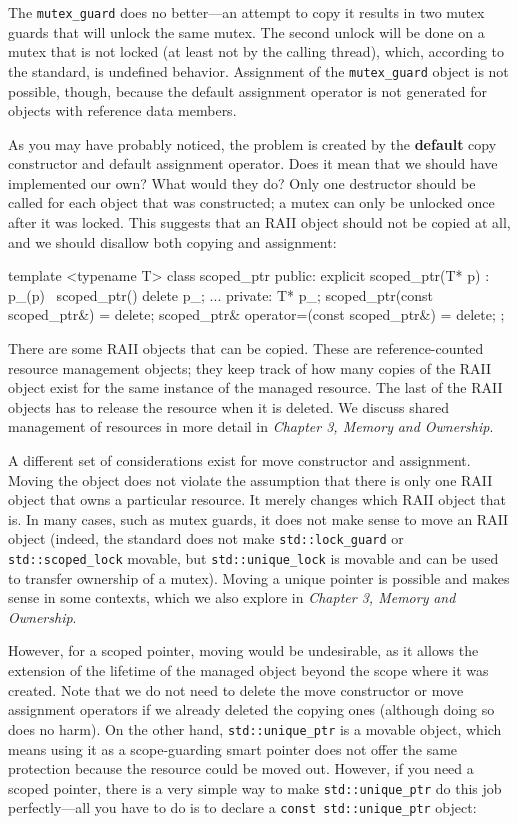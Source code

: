 The \texttt{mutex\_guard} does no better---an attempt to copy it results in two mutex guards that will unlock the same mutex. The second unlock will be done on a mutex that is not locked (at least not by the calling thread), which, according to the standard, is undefined behavior. Assignment of the \texttt{mutex\_guard} object is not possible, though, because the default assignment operator is not generated for objects with reference data members.

As you may have probably noticed, the problem is created by the \textbf{default} copy constructor and default assignment operator. Does it mean that we should have implemented our own? What would they do? Only one destructor should be called for each object that was constructed; a mutex can only be unlocked once after it was locked. This suggests that an RAII object should not be copied at all, and we should disallow both copying and assignment:

\begin{code}
template <typename T> class scoped_ptr {
  public:
  explicit scoped_ptr(T* p) : p_(p) {}
  ~scoped_ptr() { delete p_; }
  ...
  private:
  T* p_;
  scoped_ptr(const scoped_ptr&) = delete;
  scoped_ptr& operator=(const scoped_ptr&) = delete;
};
\end{code}

There are some RAII objects that can be copied. These are reference-counted resource management objects; they keep track of how many copies of the RAII object exist for the same instance of the managed resource. The last of the RAII objects has to release the resource when it is deleted. We discuss shared management of resources in more detail in \emph{Chapter 3, Memory} \emph{and Ownership}.

A different set of considerations exist for move constructor and assignment. Moving the object does not violate the assumption that there is only one RAII object that owns a particular resource. It merely changes which RAII object that is. In many cases, such as mutex guards, it does not make sense to move an RAII object (indeed, the standard does not make \texttt{std::lock\_guard} or \texttt{std::scoped\_lock} movable, but \texttt{std::unique\_lock} is movable and can be used to transfer ownership of a mutex). Moving a unique pointer is possible and makes sense in some contexts, which we also explore in \emph{Chapter 3, Memory} \emph{and Ownership}.

However, for a scoped pointer, moving would be undesirable, as it allows the extension of the lifetime of the managed object beyond the scope where it was created. Note that we do not need to delete the move constructor or move assignment operators if we already deleted the copying ones (although doing so does no harm). On the other hand, \texttt{std::unique\_ptr} is a movable object, which means using it as a scope-guarding smart pointer does not offer the same protection because the resource could be moved out. However, if you need a scoped pointer, there is a very simple way to make \texttt{std::unique\_ptr} do this job perfectly---all you have to do is to declare a \texttt{const\ }\texttt{std::unique\_ptr} object:


